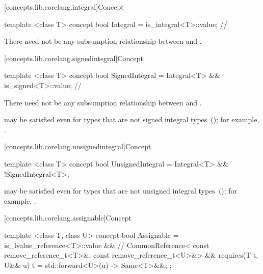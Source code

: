 [concepts.lib.corelang.integral]{Concept }

%
\begin{itemdecl}
template <class T>
concept bool Integral = is_integral<T>::value; // \seebelow
\end{itemdecl}

\begin{itemdescr}
\pnum
There need not be any subsumption relationship between  and
.
\end{itemdescr}

[concepts.lib.corelang.signedintegral]{Concept }

%
\begin{itemdecl}
template <class T>
concept bool SignedIntegral = Integral<T> && is_signed<T>::value; // \seebelow
\end{itemdecl}

\begin{itemdescr}
\pnum
There need not be any subsumption relationship between  and
.

\pnum
\enternote {} may be satisfied even for
types that are not signed integral types~();
for example, .
\exitnote
\end{itemdescr}

[concepts.lib.corelang.unsignedintegral]{Concept }

%
\begin{itemdecl}
template <class T>
concept bool UnsignedIntegral = Integral<T> && !SignedIntegral<T>;
\end{itemdecl}

\begin{itemdescr}
\pnum
\enternote {} may be satisfied even for
types that are not unsigned integral types~();
for example, .
\exitnote
\end{itemdescr}

[concepts.lib.corelang.assignable]{Concept }

%
\begin{itemdecl}
template <class T, class U>
concept bool Assignable =
  is_lvalue_reference<T>::value && // \seebelow
  CommonReference<
    const remove_reference_t<T>&,
    const remove_reference_t<U>&> &&
  requires(T t, U&& u) {
    { t = std::forward<U>(u) } -> Same<T>&&;
  };
\end{itemdecl}

